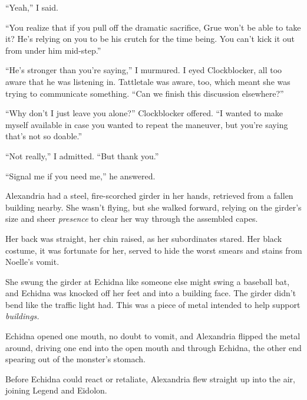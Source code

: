 ``Yeah,'' I said.



``You realize that if you pull off the dramatic sacrifice, Grue won't be able to take it?  He's relying on you to be his crutch for the time being.  You can't kick it out from under him mid-step.''



``He's stronger than you're saying,'' I murmured.  I eyed Clockblocker, all too aware that he was listening in.  Tattletale was aware, too, which meant she was trying to communicate something.  ``Can we finish this discussion elsewhere?''



``Why don't I just leave you alone?'' Clockblocker offered.  ``I wanted to make myself available in case you wanted to repeat the maneuver, but you're saying that's not so doable.''



``Not really,'' I admitted.  ``But thank you.''



``Signal me if you need me,'' he answered.



Alexandria had a steel, fire-scorched girder in her hands, retrieved from a fallen building nearby.  She wasn't flying, but she walked forward, relying on the girder's size and sheer \emph{presence} to clear her way through the assembled capes.



Her back was straight, her chin raised, as her subordinates stared.  Her black costume, it was fortunate for her, served to hide the worst smears and stains from Noelle's vomit.



She swung the girder at Echidna like someone else might swing a baseball bat, and Echidna was knocked off her feet and into a building face.  The girder didn't bend like the traffic light had.  This was a piece of metal intended to help support \emph{buildings.}



Echidna opened one mouth, no doubt to vomit, and Alexandria flipped the metal around, driving one end into the open mouth and through Echidna, the other end spearing out of the monster's stomach.



Before Echidna could react or retaliate, Alexandria flew straight up into the air, joining Legend and Eidolon.




